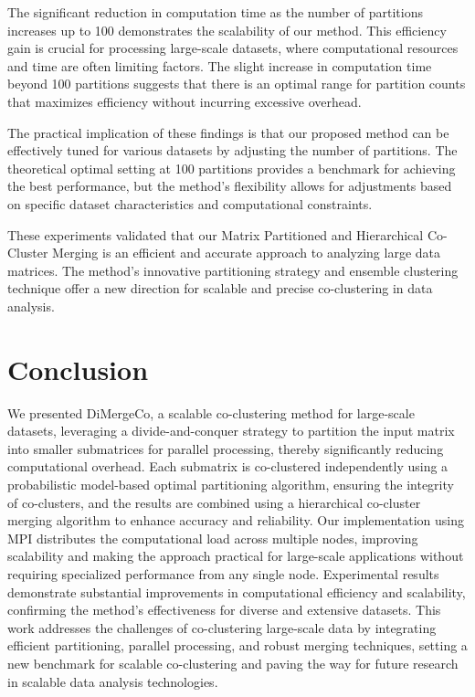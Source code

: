 \documentclass[journal]{IEEEtran}
\begin{document}
The significant reduction in computation time as the number of partitions increases up to 100 demonstrates the scalability of our method. This efficiency gain is crucial for processing large-scale datasets, where computational resources and time are often limiting factors. The slight increase in computation time beyond 100 partitions suggests that there is an optimal range for partition counts that maximizes efficiency without incurring excessive overhead.

The practical implication of these findings is that our proposed method can be effectively tuned for various datasets by adjusting the number of partitions. The theoretical optimal setting at 100 partitions provides a benchmark for achieving the best performance, but the method's flexibility allows for adjustments based on specific dataset characteristics and computational constraints.

These experiments validated that our Matrix Partitioned and Hierarchical Co-Cluster Merging is an efficient and accurate approach to analyzing large data matrices. The method's innovative partitioning strategy and ensemble clustering technique offer a new direction for scalable and precise co-clustering in data analysis.

\section{Conclusion}
\label{sec:conclusion}
We presented DiMergeCo, a scalable co-clustering method for large-scale datasets, leveraging a divide-and-conquer strategy to partition the input matrix into smaller submatrices for parallel processing, thereby significantly reducing computational overhead. Each submatrix is co-clustered independently using a probabilistic model-based optimal partitioning algorithm, ensuring the integrity of co-clusters, and the results are combined using a hierarchical co-cluster merging algorithm to enhance accuracy and reliability. Our implementation using MPI distributes the computational load across multiple nodes, improving scalability and making the approach practical for large-scale applications without requiring specialized performance from any single node. Experimental results demonstrate substantial improvements in computational efficiency and scalability, confirming the method's effectiveness for diverse and extensive datasets. This work addresses the challenges of co-clustering large-scale data by integrating efficient partitioning, parallel processing, and robust merging techniques, setting a new benchmark for scalable co-clustering and paving the way for future research in scalable data analysis technologies.
\end{document}
